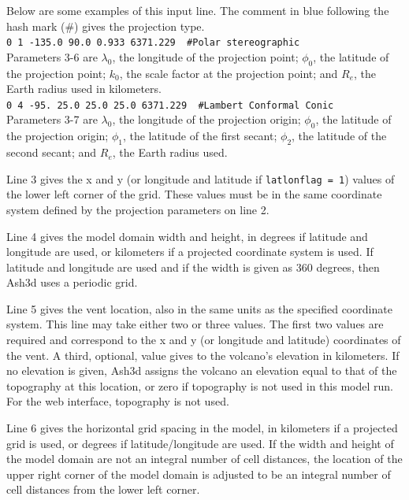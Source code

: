 \normalsize
Below are some examples of
this input line. The comment in blue following the hash mark (\#) gives
the projection type.\\
\texttt{0 1 -135.0 90.0 0.933 6371.229 {\color{blue} \#Polar stereographic}}\\
Parameters 3-6 are
$\lambda_0$, the longitude of the projection point;
$\phi_0$, the latitude of the projection point;
$k_0$, the scale factor at the projection point;
and $R_e$, the Earth radius used in kilometers.\\
\texttt{0 4 -95. 25.0 25.0 25.0 6371.229 {\color{blue} \#Lambert Conformal Conic}}\\
Parameters 3-7 are
$\lambda_0$, the longitude of the projection origin;
$\phi_0$, the latitude of the projection origin;
$\phi_1$, the latitude of the first secant;
$\phi_2$, the latitude of the second secant;
and $R_e$, the Earth radius used.

Line 3 gives the x and y (or longitude and latitude if \texttt{latlonflag = 1})
values of the lower
left corner of the grid. These values must be in the same coordinate system
defined by the projection parameters on line 2.

Line 4 gives the model domain width and height, in degrees if latitude and
longitude are used, or kilometers if a projected coordinate system is used.
If latitude and longitude are used and if the width is given as 360 degrees,
then Ash3d uses a periodic grid.

Line 5 gives the vent location, also in the same units as the specified
coordinate system. This line may take either two or three values. The first
two values are required and correspond to the x and y (or longitude and
latitude) coordinates of the vent. A third, optional, value gives to the
volcano’s elevation in
kilometers. If no elevation is given, Ash3d assigns the volcano an elevation
equal to that of the topography at this location, or zero if topography is
not used in this model run. For the web interface, topography is not used.

Line 6 gives the horizontal grid spacing in the model, in kilometers if a
projected grid is used, or degrees if latitude/longitude are used. If the
width and height of the model domain are not an integral number of cell
distances, the location of the upper right corner of the model domain is
adjusted to be an integral number of cell distances from the lower left
corner.

